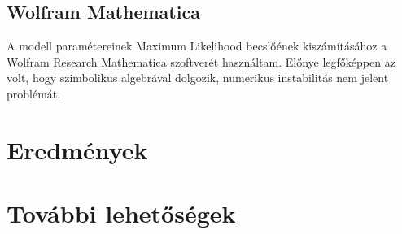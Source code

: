 \documentclass[]{article}
\begin{document}
\subsection{Wolfram Mathematica}
A modell paramétereinek Maximum Likelihood becslőének kiszámításához a Wolfram Research Mathematica szoftverét használtam. Előnye legfőképpen az volt, hogy szimbolikus algebrával dolgozik, numerikus instabilitás nem jelent problémát.


\section{Eredmények}

\section{További lehetőségek}
\end{document}
